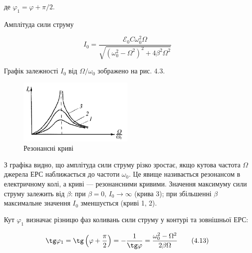 \documentclass[12pt,a4paper]{article}
\begin{document}
    де $\varphi_1 = \varphi + \pi/2$.

    Амплітуда сили струму

    \vspace{0.5em}

    \begin{equation}
        I_0 = \frac{\mathcal{E}_0 C \omega_0^2 \Omega}{\sqrt{\left(\omega_0^2 - \Omega^2 \right)^2 + 4\beta^2\Omega^2}}
        \tag{4.12}
    \end{equation}

    \vspace{0.5em}

    Графік залежності $I_0$ від $\Omega / \omega_0$ зображено на рис. 4.3.

    \begin{figure}[h!]

        \renewcommand{\thefigure}{4.\arabic{figure}} %

        \centering
        \includegraphics[width=0.5\textwidth]{4.3.png}
        \caption{Резонансні криві}
        \label{fig3:schema}

    \end{figure}

    З графіка видно, що амплітуда сили струму різко зростає,
    якщо кутова частота $\Omega$ джерела ЕРС наближається до частоти
    $\omega_0$. Це явище називається резонансом в електричному колі,
    а криві --- резонансними кривими.
    Значення максимуму сили струму залежить від
    $\beta$: при $\beta = 0$, $I_0 \rightarrow \infty$ (крива 3);
    при збільшенні $\beta$ максимальне значення $I_0$ зменшується (криві 1, 2).

    Кут $\varphi_1$ визначає різницю фаз коливань сили струму у контурі та зовнішньої ЕРС:

    \vspace{0.5em}

    \begin{equation}
        \tg \varphi_1 = \tg \left( \varphi + \frac{\pi}{2} \right) = - \frac{1}{\tg \varphi} = \frac{\omega_0^2 - \Omega^2}{2\beta \Omega}
        \tag{4.13}
    \end{equation}
\end{document}
